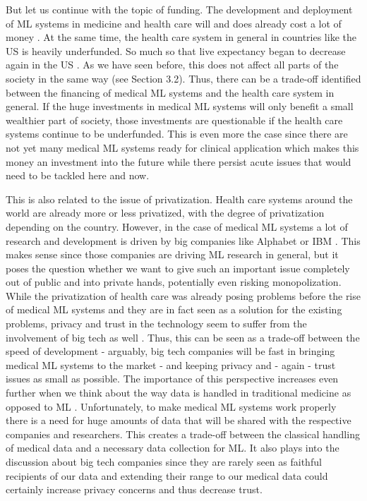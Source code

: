 But let us continue with the topic of funding. The development and deployment of ML systems in medicine and health care will and does already cost a lot of money \cite{he2019practical}. At the same time, the health care system in general in countries like the US is heavily underfunded. So much so that live expectancy began to decrease again in the US \cite{topol2019high}. As we have seen before, this does not affect all parts of the society in the same way (see Section 3.2). Thus, there can be a trade-off identified between the financing of medical ML systems and the health care system in general. If the huge investments in medical ML systems will only benefit a small wealthier part of society, those investments are questionable if the health care systems continue to be underfunded. This is even more the case since there are not yet many medical ML systems ready for clinical application which makes this money an investment into the future while there persist acute issues that would need to be tackled here and now.

This is also related to the issue of privatization. Health care systems around the world are already more or less privatized, with the degree of privatization depending on the country. However, in the case of medical ML systems a lot of research and development is driven by big companies like Alphabet or IBM \cite{Morley2020}. This makes sense since those companies are driving ML research in general, but it poses the question whether we want to give such an important issue completely out of public and into private hands, potentially even risking monopolization. While the privatization of health care was already posing problems before the rise of medical ML systems and they are in fact seen as a solution for the existing problems, privacy and trust in the technology seem to suffer from the involvement of big tech as well \cite{Morley2020, topol2019high}. Thus, this can be seen as a trade-off between the speed of development - arguably, big tech companies will be fast in bringing medical ML systems to the market - and keeping privacy and - again - trust issues as small as possible. The importance of this perspective increases even further when we think about the way data is handled in traditional medicine as opposed to ML \cite{he2019practical}. Unfortunately, to make medical ML systems work properly there is a need for huge amounts of data that will be shared with the respective companies and researchers. This creates a trade-off between the classical handling of medical data and a necessary data collection for ML. It also plays into the discussion about big tech companies since they are rarely seen as faithful recipients of our data and extending their range to our medical data could certainly increase privacy concerns and thus decrease trust.

